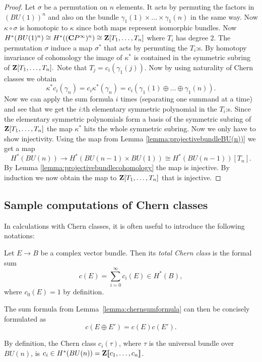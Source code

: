 \documentclass[a4paper,openany]{scrbook}
\begin{document}
\begin{proof}
Let $\sigma$ be a permutation on $n$ elements. It acts by permuting the factors in $(BU(1))^n$ and also on the bundle $\gamma_1(1)\times \dots \times \gamma_1(n)$ in the same way. Now $\kappa \circ \sigma$ is homotopic to $\kappa$ since both maps represent isomorphic bundles. Now $H^*(BU(1)^n)\cong H^*((\mathbf C P^\infty)^n)\cong \mathbf Z [T_1,\dots,T_n]$ where $T_i$ has degree $2.$ The permutation $\sigma$ induce a map $\sigma^*$ that acts by permuting the $T_i$:s. By homotopy invariance of cohomology the image of $\kappa^*$ is contained in the symmetric subring of $\mathbf Z [T_1,\dots,T_n].$ Note that $T_j=c_i(\gamma_1(j)).$ Now by using naturality of Chern classes we obtain $$\kappa^*c_i(\gamma_n)=c_i\kappa^*(\gamma_n)=c_i(\gamma_1(1)\oplus \dots \oplus \gamma_1(n)).$$ Now we can apply the sum formula $i$ times (separating one summand at a time) and see that we get the $i$:th elementary symmetric polynomial in the $T_i$:s. Since the elementary symmetric polynomials form a basis of the symmetric subring of $\mathbf Z [T_1,\dots,T_n]$ the map $\kappa^*$ hits the whole symmetric subring. Now we only have to show injectivity. Using the map from Lemma \ref{lemma:projectivebundleBU(n))} we get a map $$H^*(BU(n))\rightarrow H^*(BU(n-1)\times BU(1))\cong H^*(BU(n-1))[T_n].$$ By Lemma \ref{lemma:projectivebundlecohomology} the map is injective. By induction we now obtain the map to $\mathbf Z [T_1,\dots,T_n]$ that is injective.
\end{proof}

\subsection{Sample computations of Chern classes}\label{subsec:computationschern}

In calculations with Chern classes, it is often useful to introduce the following notations:

\begin{defn}
Let $E \to B$ be a complex vector bundle. Then its \emph{total Chern class} is the formal sum
\[
c(E) = \sum_{i=0}^\infty c_i(E) \in H^*(B),
\]
where $c_0(E)=1$ by definition.
\end{defn}
The sum formula from Lemma~\ref{lemma:chernsumformula} can then be concisely formulated as
\[
c(E \oplus E') = c(E)c(E').
\]

By definition, the Chern class $c_i(\tau)$, where $\tau$ is the universal bundle over $BU(n)$, is $c_i \in H^*(BU(n)) = \mathbf Z[\![c_1,\dots,c_n]\!]$.
\end{document}
